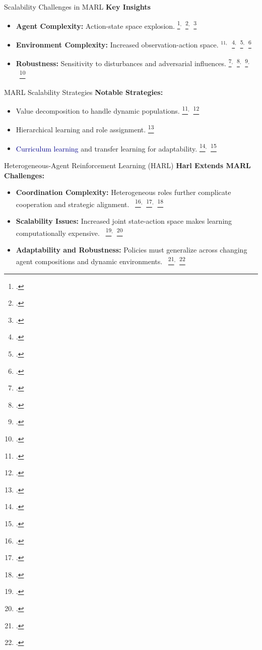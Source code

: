 \begin{frame}{Scalability Challenges in MARL}
    \textbf{Key Insights}
    \begin{itemize}
        \item \textbf{Agent Complexity:} Action-state space explosion.
            \footcite{lillicrap2019}$^,$~\footcite{baker2019}$^,$~\footcite{leibo2021}
        \item \textbf{Environment Complexity:} Increased observation-action space.
            $^{11,}$~\footcite{ye2020}$^,$~\footcite{shukla2022}$^,$~\footcite{liang2024}
        \item \textbf{Robustness:} Sensitivity to disturbances and adversarial influences.
            \footcite{gleave2021}$^,$~\footcite{li2019}$^,$~\footcite{spooner2020}$^,$~\footcite{guo2022}
    \end{itemize}
    \vspace{0.5em}
\end{frame}


\begin{frame}{MARL Scalability Strategies}
    \textbf{Notable Strategies:}
    \begin{itemize}
        \item Value decomposition to handle dynamic populations.
            \footcite{zhang2021}$^,$~\footcite{nguyen2020}
        \item Hierarchical learning and role assignment.
            \footcite{cui2022}
        \item \textcolor{DarkBlue}{Curriculum learning} and transfer learning for adaptability.
            \footcite{shukla2022}$^,$~\footcite{shi2023}
    \end{itemize}
\end{frame}

\begin{frame}{Heterogeneous-Agent Reinforcement Learning (HARL)}
    \textbf{Harl Extends MARL Challenges:}
    \begin{itemize}
        \item \textbf{Coordination Complexity:} Heterogeneous roles further complicate 
            cooperation and strategic alignment.
            ~\footcite{wakilpoor2020}$^,$~\footcite{yang2020a}$^,$~\footcite{gronauer2022}
        \item \textbf{Scalability Issues:} Increased joint state-action space makes 
            learning computationally expensive.
            ~\footcite{leibo2021}$^,$~\footcite{rizk2019}
        \item \textbf{Adaptability and Robustness:} Policies must generalize across 
            changing agent compositions and dynamic environments.
            ~\footcite{yang2021a}$^,$~\footcite{koster2020}
    \end{itemize}
\end{frame}

